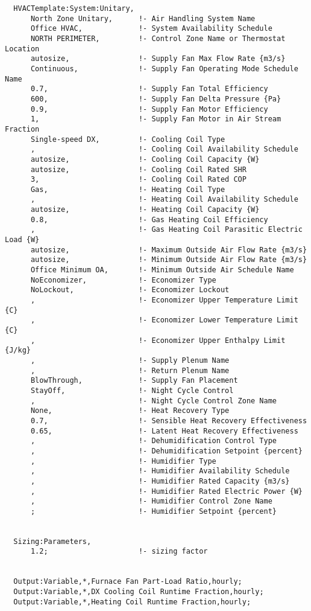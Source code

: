 \begin{lstlisting}
  HVACTemplate:System:Unitary,
      North Zone Unitary,      !- Air Handling System Name
      Office HVAC,             !- System Availability Schedule
      NORTH PERIMETER,         !- Control Zone Name or Thermostat Location
      autosize,                !- Supply Fan Max Flow Rate {m3/s}
      Continuous,              !- Supply Fan Operating Mode Schedule Name
      0.7,                     !- Supply Fan Total Efficiency
      600,                     !- Supply Fan Delta Pressure {Pa}
      0.9,                     !- Supply Fan Motor Efficiency
      1,                       !- Supply Fan Motor in Air Stream Fraction
      Single-speed DX,         !- Cooling Coil Type
      ,                        !- Cooling Coil Availability Schedule
      autosize,                !- Cooling Coil Capacity {W}
      autosize,                !- Cooling Coil Rated SHR
      3,                       !- Cooling Coil Rated COP
      Gas,                     !- Heating Coil Type
      ,                        !- Heating Coil Availability Schedule
      autosize,                !- Heating Coil Capacity {W}
      0.8,                     !- Gas Heating Coil Efficiency
      ,                        !- Gas Heating Coil Parasitic Electric Load {W}
      autosize,                !- Maximum Outside Air Flow Rate {m3/s}
      autosize,                !- Minimum Outside Air Flow Rate {m3/s}
      Office Minimum OA,       !- Minimum Outside Air Schedule Name
      NoEconomizer,            !- Economizer Type
      NoLockout,               !- Economizer Lockout
      ,                        !- Economizer Upper Temperature Limit {C}
      ,                        !- Economizer Lower Temperature Limit {C}
      ,                        !- Economizer Upper Enthalpy Limit {J/kg}
      ,                        !- Supply Plenum Name
      ,                        !- Return Plenum Name
      BlowThrough,             !- Supply Fan Placement
      StayOff,                 !- Night Cycle Control
      ,                        !- Night Cycle Control Zone Name
      None,                    !- Heat Recovery Type
      0.7,                     !- Sensible Heat Recovery Effectiveness
      0.65,                    !- Latent Heat Recovery Effectiveness
      ,                        !- Dehumidification Control Type
      ,                        !- Dehumidification Setpoint {percent}
      ,                        !- Humidifier Type
      ,                        !- Humidifier Availability Schedule
      ,                        !- Humidifier Rated Capacity {m3/s}
      ,                        !- Humidifier Rated Electric Power {W}
      ,                        !- Humidifier Control Zone Name
      ;                        !- Humidifier Setpoint {percent}


  Sizing:Parameters,
      1.2;                     !- sizing factor


  Output:Variable,*,Furnace Fan Part-Load Ratio,hourly;
  Output:Variable,*,DX Cooling Coil Runtime Fraction,hourly;
  Output:Variable,*,Heating Coil Runtime Fraction,hourly;
\end{lstlisting}

